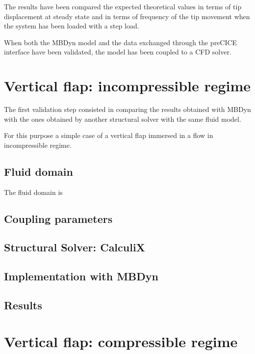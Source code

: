 The results have been compared the expected theoretical values in terms of tip displacement at steady state and in terms of frequency of the tip movement when the system has been loaded with a step load.

When both the MBDyn model and the data exchanged through the preCICE interface have been validated, the model has been coupled to a CFD solver.





\section{Vertical flap: incompressible regime}
\label{sec:cx-mbd}

The first validation step consisted in comparing the results obtained with MBDyn with the ones obtained by another structural solver with the same fluid model.

For this purpose a simple case of a vertical flap immersed in a flow in incompressible regime.

\subsection{Fluid domain}

The fluid domain is 

\subsection{Coupling parameters}


\subsection{Structural Solver: CalculiX}
 
 
\subsection{Implementation with MBDyn}


\subsection{Results}







\section{Vertical flap: compressible regime}
\label{sec:su2-mbd}

